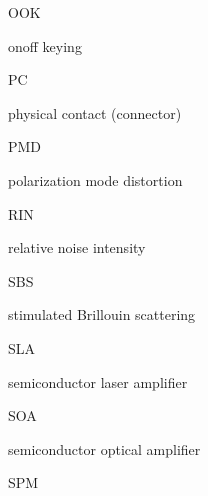 \documentclass[letterpaper,10pt,english]{sphinxmanual}
\begin{document}
OOK





on\sphinxhyphen{}off keying









PC





physical contact (connector)









PMD





polarization mode distortion









RIN





relative noise intensity









SBS





stimulated Brillouin scattering









SLA





semiconductor laser amplifier









SOA





semiconductor optical amplifier









SPM
\end{document}
